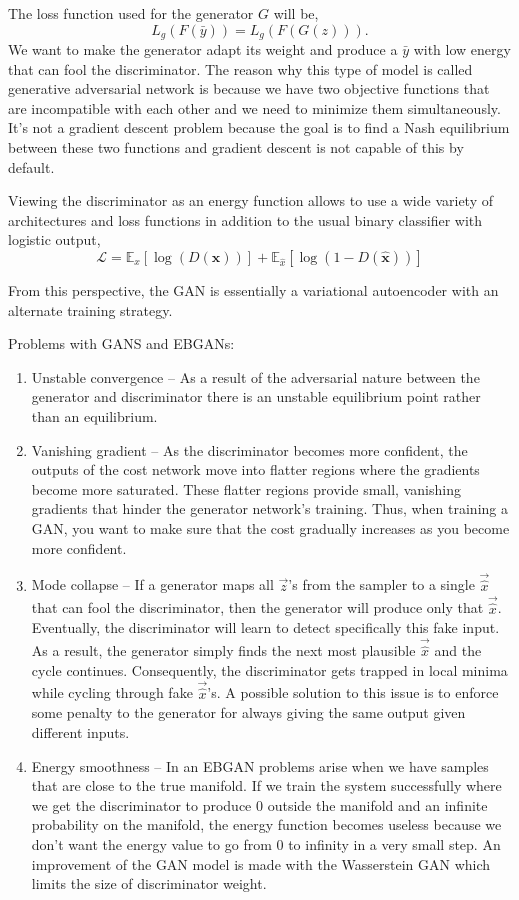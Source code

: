 \documentclass{article}
\begin{document}
The loss function used for the generator $G$ will be,
\[
    L_g(F(\bar y)) = L_g(F(G(z))).
\]
We want to make the generator adapt its weight and produce a $\bar{y}$ with low energy that can fool the discriminator. The reason why this type of model is called generative adversarial network is because we have two objective functions that are incompatible with each other and we need to minimize them simultaneously. It’s not a gradient descent problem because the goal is to find a Nash equilibrium between these two functions and gradient descent is not capable of this by default. 

Viewing the discriminator as an energy function allows to use a wide variety of architectures and loss functions in addition to the usual binary classifier with logistic output,
\[
    \mathcal{L} = \mathbb{E}_x [\log(D(\boldsymbol{x} ))] + \mathbb{E}_{\hat{x}}[\log(1-D(\boldsymbol{\hat{x}}))] 
\]

From this perspective, the GAN is essentially a variational autoencoder with an alternate training strategy.

Problems with GANS and EBGANs:
\begin{enumerate}
    \item Unstable convergence -- As a result of the adversarial nature between the generator and discriminator there is an unstable equilibrium point rather than an equilibrium.

    \item Vanishing gradient -- As the discriminator becomes more confident, the outputs of the cost network move into flatter regions where the gradients become more saturated. These flatter regions provide small, vanishing gradients that hinder the generator network's training. Thus, when training a GAN, you want to make sure that the cost gradually increases as you become more confident.

    \item Mode collapse -- If a generator maps all $\vec{z}$'s from the sampler to a single $\vec{\hat{x}}$ that can fool the discriminator, then the generator will produce only that $\vec{\hat{x}}$. Eventually, the discriminator will learn to detect specifically this fake input. As a result, the generator simply finds the next most plausible $\vec{\hat{x}}$ and the cycle continues. Consequently, the discriminator gets trapped in local minima while cycling through fake $\vec{\hat{x}}$’s. A possible solution to this issue is to enforce some penalty to the generator for always giving the same output given different inputs.
    
    \item Energy smoothness -- In an EBGAN problems arise when we have samples that are close to the true manifold. If we train the system successfully where we get the discriminator to produce $0$ outside the manifold and an infinite probability on the manifold, the energy function becomes useless because we don’t want the energy value to go from $0$ to infinity in a very small step. An improvement of the GAN model is made with the Wasserstein GAN which limits the size of discriminator weight.
\end{enumerate}
\end{document}
